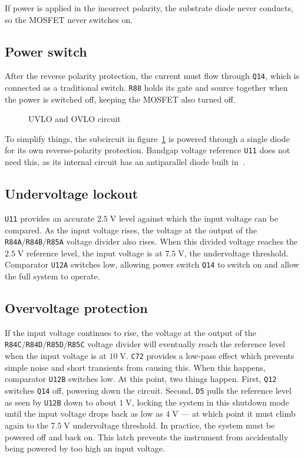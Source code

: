 \documentclass[article]{memoir}
\newcommand{\refdes}[1]{\texttt{#1}}
\newcommand{\mr}[1]{\ensuremath{\mathrm{#1}}}
\begin{document}
\begin{multicols}{2}
If power is applied in the incorrect polarity, the substrate diode never
conducts, so the MOSFET never switches on.

\subsection{Power switch}

After the reverse polarity protection, the current must flow through
\refdes{Q14}, which is connected as a traditional switch. \refdes{R88} holds
its gate and source together when the power is switched off, keeping the MOSFET
also turned off.

\begin{figure}[H]
\centering
{}
\caption{UVLO and OVLO circuit}
\label{fig:uovlo}
\end{figure}

To simplify things, the subcircuit in figure~\ref{fig:uovlo} is powered through
a single diode for its own reverse-polarity protection. Bandgap voltage reference
\refdes{U11} does not need this, as its internal circuit has an antiparallel diode
built in~\cite{tl431}.

\subsection{Undervoltage lockout}

\refdes{U11} provides an accurate $2.5\;\mr{V}$ level against which the input
voltage can be compared. As the input voltage rises, the voltage at the output of
the \refdes{R84A}/\refdes{R84B}/\refdes{R85A} voltage divider also rises. When
this divided voltage reaches the $2.5\;\mr{V}$ reference level, the input voltage
is at $7.5\;\mr{V}$, the undervoltage threshold. Comparator \refdes{U12A}
switches low, allowing power switch \refdes{Q14} to switch on and allow the
full system to operate.

\subsection{Overvoltage protection}

If the input voltage continues to rise, the voltage at the output of the
\refdes{R84C}/\refdes{R84D}/\refdes{R85D}/\refdes{R85C} voltage divider will
eventually reach the reference level when the input voltage is at $10\;\mr{V}$.
\refdes{C72} provides a low-pass effect which prevents simple noise and short
transients from causing this. When this happens, comparator \refdes{U12B}
switches low. At this point, two things happen. First, \refdes{Q12} switches
\refdes{Q14} off, powering down the circuit. Second, \refdes{D5} pulls the
reference level as seen by \refdes{U12B} down to about $1\;\mr{V}$, locking
the system in this shutdown mode until the input voltage drops back as low
as $4\;\mr{V}$ --- at which point it must climb again to the $7.5\;\mr{V}$
undervoltage threshold. In practice, the system must be powered off and back
on. This latch prevents the instrument from accidentally being powered by
too high an input voltage.


\end{multicols}
\end{document}
